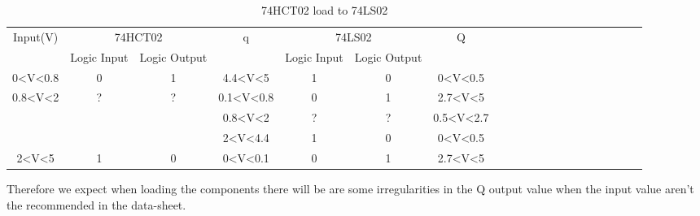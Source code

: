 	\begin{center}
	\begin{table}[h!]
	\begin{tabular}{llllllllllllllllllll}
	\cline{1-7}
	\multicolumn{1}{|c|}{\multirow{2}{*}{Input(V)}} & \multicolumn{2}{c|}{74HCT02} & \multicolumn{1}{c|}{\multirow{2}{*}{q}} & \multicolumn{2}{c|}{74LS02} & \multicolumn{1}{c|}{\multirow{2}{*}{Q}}  \\ \cline{2-3} \cline{5-6}
	\multicolumn{1}{|c|}{} & \multicolumn{1}{c|}{Logic Input} & \multicolumn{1}{c|}{Logic Output} & \multicolumn{1}{c|}{} & \multicolumn{1}{c|}{Logic Input} & \multicolumn{1}{c|}{Logic Output} & \multicolumn{1}{c|}{}  \\ \cline{1-7}
	\multicolumn{1}{|c|}{0\textless{}V\textless{}0.8} & \multicolumn{1}{c|}{0} & \multicolumn{1}{c|}{1} & \multicolumn{1}{c|}{4.4\textless{}V\textless{}5} & \multicolumn{1}{c|}{1} & \multicolumn{1}{c|}{0} & \multicolumn{1}{c|}{0\textless{}V\textless{}0.5}  \\ \cline{1-7}
	\multicolumn{1}{|c|}{\multirow{3}{*}{0.8\textless{}V\textless{}2}} & \multicolumn{1}{c|}{\multirow{3}{*}{?}} & \multicolumn{1}{c|}{\multirow{3}{*}{?}} & \multicolumn{1}{c|}{0.1\textless{}V\textless{}0.8} & \multicolumn{1}{c|}{0} & \multicolumn{1}{c|}{1} & \multicolumn{1}{c|}{2.7\textless{}V\textless{}5}  \\ \cline{4-7}
	\multicolumn{1}{|c|}{} & \multicolumn{1}{c|}{} & \multicolumn{1}{c|}{} & \multicolumn{1}{c|}{0.8\textless{}V\textless{}2} & \multicolumn{1}{c|}{?} & \multicolumn{1}{c|}{?} & \multicolumn{1}{c|}{0.5\textless{}V\textless{}2.7}  \\ \cline{4-7}
	\multicolumn{1}{|c|}{} & \multicolumn{1}{c|}{} & \multicolumn{1}{c|}{} & \multicolumn{1}{c|}{2\textless{}V\textless{}4.4} & \multicolumn{1}{c|}{1} & \multicolumn{1}{c|}{0} & \multicolumn{1}{c|}{0\textless{}V\textless{}0.5}  \\ \cline{1-7}
	\multicolumn{1}{|c|}{2\textless{}V\textless{}5} & \multicolumn{1}{c|}{1} & \multicolumn{1}{c|}{0} & \multicolumn{1}{c|}{0\textless{}V\textless{}0.1} & \multicolumn{1}{c|}{0} & \multicolumn{1}{c|}{1} & \multicolumn{1}{c|}{2.7\textless{}V\textless{}5}\\ \cline{1-7}
	\end{tabular}
	\caption{\color{cyan}74HCT02 load to 74LS02}
	\label{fig:ej2thhcttols}
	\end{table}
	\end{center}
	
	Therefore we expect when loading the components there will be are some irregularities in the Q output value when the input value aren't the recommended in the data-sheet. 

